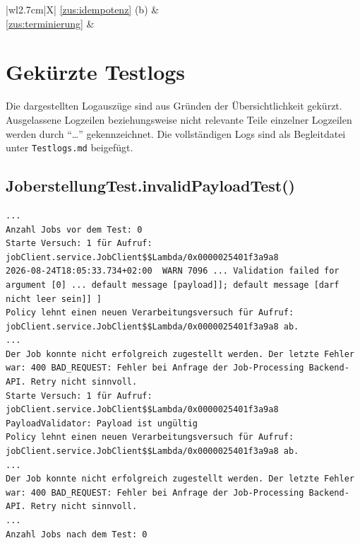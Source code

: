 \begin{table}[h]
\begin{tabularx}{\textwidth}{|w{l}{2.7cm}|X|}
        \ref{zus:idempotenz} (b) &  \\ \hline
        \ref{zus:terminierung} &  \\ \hline
    \end{tabularx}
    \caption[Zuordnung von Fehlerinjektionen zu den jeweiligen Testmethoden]{Zuordnung der definierten Fehlerinjektionen
    zu den Testmethoden, mit denen ihre Einhaltung im Rahmen der Evaluation überprüft wird.}
    \label{tab:zuordnung_zusicherungen_tests}
\end{table}

\newpage

\section{Gekürzte Testlogs}
\label{sec:testlogs}
Die dargestellten Logauszüge sind aus Gründen der Übersichtlichkeit gekürzt.
Ausgelassene Logzeilen beziehungsweise nicht relevante Teile einzelner Logzeilen werden durch ``\dots'' gekennzeichnet.
Die vollständigen Logs sind als Begleitdatei unter \texttt{Testlogs.md} beigefügt.

\subsection*{JoberstellungTest.invalidPayloadTest()}
\label{subsec:testlog_z1}
\begin{lstlisting}[language={}, style=logs, numbers=none]
...
Anzahl Jobs vor dem Test: 0
Starte Versuch: 1 für Aufruf: jobClient.service.JobClient$$Lambda/0x0000025401f3a9a8
2026-08-24T18:05:33.734+02:00  WARN 7096 ... Validation failed for argument [0] ... default message [payload]]; default message [darf nicht leer sein]] ]
Policy lehnt einen neuen Verarbeitungsversuch für Aufruf: jobClient.service.JobClient$$Lambda/0x0000025401f3a9a8 ab.
...
Der Job konnte nicht erfolgreich zugestellt werden. Der letzte Fehler war: 400 BAD_REQUEST: Fehler bei Anfrage der Job-Processing Backend-API. Retry nicht sinnvoll.
Starte Versuch: 1 für Aufruf: jobClient.service.JobClient$$Lambda/0x0000025401f3a9a8
PayloadValidator: Payload ist ungültig
Policy lehnt einen neuen Verarbeitungsversuch für Aufruf: jobClient.service.JobClient$$Lambda/0x0000025401f3a9a8 ab.
...
Der Job konnte nicht erfolgreich zugestellt werden. Der letzte Fehler war: 400 BAD_REQUEST: Fehler bei Anfrage der Job-Processing Backend-API. Retry nicht sinnvoll.
...
Anzahl Jobs nach dem Test: 0
\end{lstlisting}

